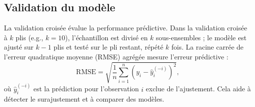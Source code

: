 \subsection{Validation du modèle}
La validation croisée \citep{James2021, hastie2009elements} évalue la performance prédictive. Dans la validation croisée à $k$ plis (e.g., $k=10$), l'échantillon est divisé en $k$ sous-ensembles ; le modèle est ajusté sur $k-1$ plis et testé sur le pli restant, répété $k$ fois. La racine carrée de l'erreur quadratique moyenne (RMSE) agrégée mesure l'erreur prédictive :
\begin{equation}
	\mathrm{RMSE} = \sqrt{\frac{1}{n} \sum_{i=1}^n (y_i - \hat{y}_i^{(-i)})^2},
\end{equation}
où $\hat{y}_i^{(-i)}$ est la prédiction pour l'observation $i$ exclue de l'ajustement. Cela aide à détecter le surajustement et à comparer des modèles.

